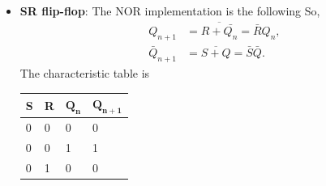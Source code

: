 \documentclass{report}
\begin{document}
\begin{itemize}
            \bigbreak \noindent 
            If the output starts
            \begin{align*}
                V_{\text{out}} = V_{OL}
            ,\end{align*}
            $V_{+}$ becomes negative, so the input $V_{-}$ must be increased until the comparator threshold is reached. The upper threshold $V_{UT}$ in this case is the voltage in which the output becomes LOW. In general,
            \begin{align*}
                V_{UT} &= \beta V_{OH}, \\
                V_{LT} &= \beta V_{OL}
            .\end{align*}
            It is called an inverting Schmitt trigger because the input signal is connected to the op-amp’s inverting input, marked −
            \bigbreak \noindent 
            The circuit’s output changes in the opposite direction from the input:
            \begin{itemize}
                \item When \(V_{\text{in}}\) rises above the upper threshold \(V_{UT}\), the output switches from HIGH to LOW.
                \item When \(V_{\text{in}}\) falls below the lower threshold \(V_{LT}\), the output switches from LOW to HIGH.
            \end{itemize}
            This follows the comparator rule.
        \item \textbf{SR flip-flop}: The NOR implementation is the following
            \bigbreak \noindent 
            \bigbreak \noindent 
            So, 
            \begin{align*}
                Q_{n+1} &= \overline{R + \bar{Q_{n}}} = \bar{R}Q_{n}, \\
                \bar{Q}_{n+1} &= \overline{S + Q} = \bar{S}\bar{Q}
            .\end{align*}
            The characteristic table is 
            \begin{center}
                \begin{tabularx}{\textwidth}{@{}XXXX@{}}
                    \toprule
                    \textbf{S} & \textbf{R} & $\mathbf{Q_{n}}$ & $\mathbf{Q_{n+1}}$ \\
                    \midrule
                    0 & 0 & 0& 0 \\[2ex]
                    0 & 0 & 1& 1\\[2ex]
                    0 & 1 & 0&  0\\[2ex]

\end{tabularx}
\end{center}
\end{itemize}
\end{document}
